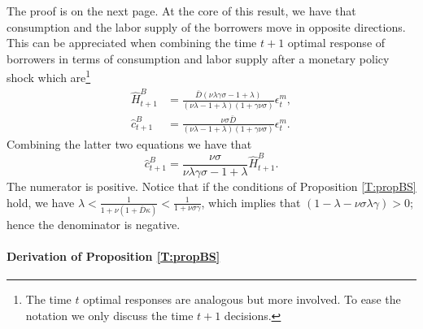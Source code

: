 \documentclass[a4paper,12pt]{article}%
\begin{document}
The proof is on the next page. At the core of this result, we have that consumption and the labor supply of the borrowers move in opposite directions. This can be appreciated when combining the time $t+1$ optimal response of borrowers in terms of consumption and labor supply after a monetary policy shock which are\footnote{The time $t$ optimal responses are analogous but more involved. To ease the notation we only discuss the time $t+1$ decisions.}
\begin{align*} 
\hat{H}^B_{t+1} &= \frac{\bar{D}(\nu \lambda \gamma \sigma- 1 +\lambda)}{ (\nu \lambda -1+\lambda) (1+\gamma\nu\sigma)}\epsilon^m_{t},\\
\hat{c}^B_{t+1} &= \frac{\nu\sigma\bar{D}}{ (\nu \lambda -1+\lambda) (1+\gamma\nu\sigma)}\epsilon^m_{t}.  
\end{align*}
Combining the latter two equations we have that 
$$ \hat{c}^B_{t+1} = \frac{\nu\sigma}{\nu \lambda \gamma \sigma- 1 +\lambda}\hat{H}^B_{t+1}. $$
The numerator is positive. Notice that if the conditions of Proposition \ref{T:propBS} hold, we have $ \lambda < \frac{1}{1+\nu(1+\bar{D}\kappa)}< \frac{1}{1+\nu\sigma\gamma}$, which implies that $(1-\lambda-\nu \sigma\lambda \gamma)>0$; hence the denominator is negative.  %

\paragraph{Derivation of Proposition \ref{T:propBS}}\label{App:propBS}

\end{document}
